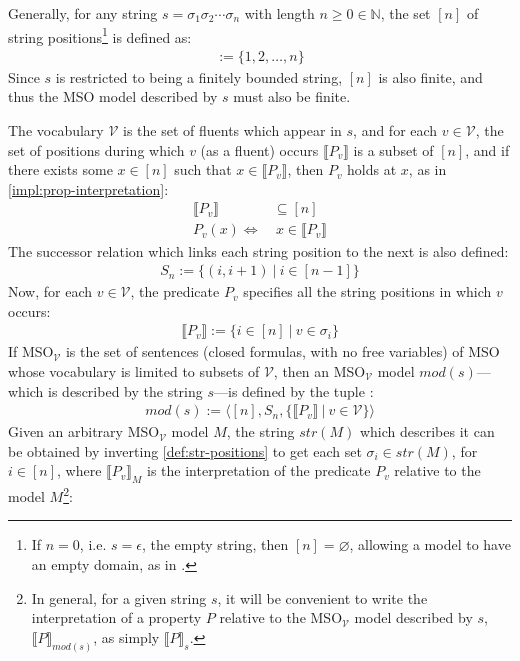 \documentclass[a4paper,12pt,leqno]{article}
\newcommand{\V}{\mathcal{V}}
\renewcommand{\emptyset}{\varnothing}
\begin{document}
Generally, for any string $s = \sigma_1\sigma_2\cdots\sigma_n$ with length $n \ge 0 \in \mathbb{N}$, the set $[n]$ of string positions\footnote{If $n = 0$, i.e. $s = \epsilon$, the empty string, then $[n] = \emptyset$, allowing a model to have an empty domain, as in \citet{Libkin2004}.} is defined as:
\begin{align}
	[n] := \{1,2,\ldots,n\}
\end{align}
Since $s$ is restricted to being a finitely bounded string, $[n]$ is also finite, and thus the MSO model described by $s$ must also be finite.

The vocabulary $\V$ is the set of fluents which appear in $s$, and for each $v \in \V$, the set of positions during which $v$ (as a fluent) occurs $\llbracket P_v \rrbracket$ is a subset of $[n]$, and if there exists some $x \in [n]$ such that $x \in \llbracket P_v \rrbracket$, then $P_v$ holds at $x$, as in \cref{impl:prop-interpretation}:
\begin{align}
	\llbracket P_v \rrbracket &\subseteq [n]\\
	P_v(x) \Longleftrightarrow& ~x \in \llbracket P_v \rrbracket
\end{align}
The successor relation which links each string position to the next is also defined:
\begin{align}
	S_n := \{(i, i+1) ~|~ i \in [n - 1]\}
\end{align}
Now, for each $v \in \V$, the predicate $P_v$ specifies all the string positions in which $v$ occurs:
\begin{align}\label{def:str-positions}
	\llbracket P_v \rrbracket := \{i \in [n] ~|~ v \in \sigma_i\}
\end{align}
If MSO$_{\V}$ is the set of sentences (closed formulas, with no free variables) of MSO whose vocabulary is limited to subsets of $\V$, then an MSO$_{\V}$ model $mod(s)$---which is described by the string $s$---is defined by the tuple \citep{fernando2016regular}:
\begin{align}
	mod(s) := \langle [n], S_n, \{\llbracket P_v \rrbracket ~|~ v \in \V\} \rangle
\end{align}
Given an arbitrary MSO$_{\V}$ model $M$, the string $str(M)$ which describes it can be obtained by inverting \cref{def:str-positions} to get each set $\sigma_i \in str(M)$, for $i \in [n]$, where $\llbracket P_v \rrbracket_M$ is the interpretation of the predicate $P_v$ relative to the model $M$\footnote{In general, for a given string $s$, it will be convenient to write the interpretation of a property $P$ relative to the MSO$_{\V}$ model described by $s$, $\llbracket P \rrbracket_{mod(s)}$, as simply $\llbracket P \rrbracket_s$.}:
\end{document}
